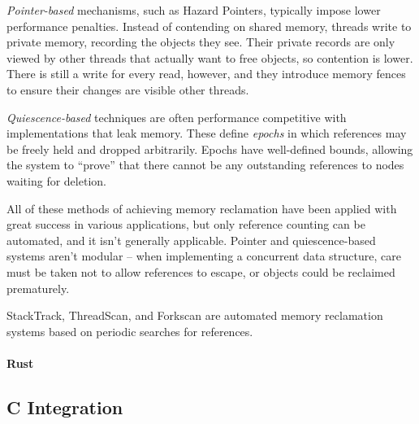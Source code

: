 \textit{Pointer-based} mechanisms, such as Hazard Pointers\cite{HP}\cite{DTA}, typically impose lower performance penalties.  Instead of contending on shared memory, threads write to private memory, recording the objects they see.  Their private records are only viewed by other threads that actually want to free objects, so contention is lower.  There is still a write for every read, however, and they introduce memory fences to ensure their changes are visible other threads.

\textit{Quiescence-based} techniques\cite{FraserH07}\cite{Harris}\cite{Hart} are often performance competitive with implementations that leak memory.  These define \textit{epochs} in which references may be freely held and dropped arbitrarily.  Epochs have well-defined bounds, allowing the system to ``prove'' that there cannot be any outstanding references to nodes waiting for deletion.

All of these methods of achieving memory reclamation have been applied with great success in various applications, but only reference counting can be automated, and it isn't generally applicable.  Pointer and quiescence-based systems aren't modular -- when implementing a concurrent data structure, care must be taken not to allow references to escape, or objects could be reclaimed prematurely.

StackTrack\cite{StackTrack}, ThreadScan\cite{Threadscan}, and Forkscan\cite{Forkscan} are automated memory reclamation systems based on periodic searches for references.

\paragraph{Rust}

\subsection{C Integration}
